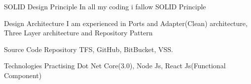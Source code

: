 

\begin{cvhonors}

  \cvhonor
    {SOLID Design Principle} %
    {In all my coding i fallow SOLID Principle} %
    { } %
    { } %

  \cvhonor
    {Design Architecture} %
    { I am experienced in Ports and Adapter(Clean) architecture, Three Layer architecture and Repository Pattern  } %
    { } %
    { } %

\cvhonor
    {Source Code Repository} %
    { TFS, GitHub, BitBucket, VSS. } %
    { } %
    { } %


\cvhonor
    {Technologies Practising   } %
    {Dot Net Core(3.0), Node Js, React Js(Functional Component) } %
    { } %
    { } %



\end{cvhonors}

